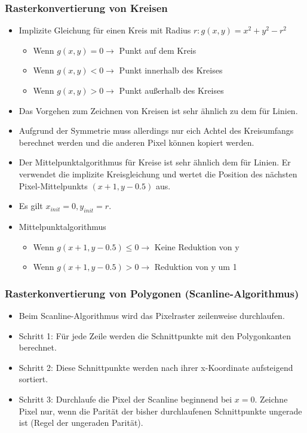\documentclass{scrartcl}
\begin{document}
\subsubsection{Rasterkonvertierung von Kreisen}

\begin{itemize}
	\item Implizite Gleichung für einen Kreis mit Radius $r: g(x,y) = x^2 + y^2 - r^2$
	\begin{itemize}
		\item Wenn $g(x,y) = 0 \rightarrow$ Punkt auf dem Kreis
		\item Wenn $g(x,y) < 0 \rightarrow$ Punkt innerhalb des Kreises
		\item Wenn $g(x,y) > 0 \rightarrow$ Punkt außerhalb des Kreises
	\end{itemize}
\end{itemize}

\begin{itemize}
	\item Das Vorgehen zum Zeichnen von Kreisen ist sehr ähnlich zu dem für Linien.
	\item Aufgrund der Symmetrie muss allerdings nur eich Achtel des Kreisumfangs berechnet werden und die anderen Pixel können kopiert werden.
\end{itemize}

\begin{itemize}
	\item Der Mittelpunktalgorithmus für Kreise ist sehr ähnlich dem für Linien. Er verwendet die implizite Kreisgleichung und wertet die Position des nächsten Pixel-Mittelpunkts $(x + 1, y - 0.5)$ aus.
	\item Es gilt $x_{init} = 0, y_{init} = r$.
	\item Mittelpunktalgorithmus
	\begin{itemize}
		\item Wenn $g(x + 1, y - 0.5) \leq 0 \rightarrow$ Keine Reduktion von y
		\item Wenn $g(x + 1, y - 0.5) > 0 \rightarrow$ Reduktion von y um 1
	\end{itemize}
\end{itemize}

\subsubsection{Rasterkonvertierung von Polygonen (Scanline-Algorithmus)}

\begin{itemize}
	\item Beim Scanline-Algorithmus wird das Pixelraster zeilenweise durchlaufen.
	\item Schritt 1: Für jede Zeile werden die Schnittpunkte mit den Polygonkanten berechnet.
	\item Schritt 2: Diese Schnittpunkte werden nach ihrer x-Koordinate aufsteigend sortiert.
	\item Schritt 3: Durchlaufe die Pixel der Scanline beginnend bei $x = 0$. Zeichne Pixel nur, wenn die Parität der bisher durchlaufenen Schnittpunkte ungerade ist (Regel der ungeraden Parität).
\end{itemize}
\end{document}

